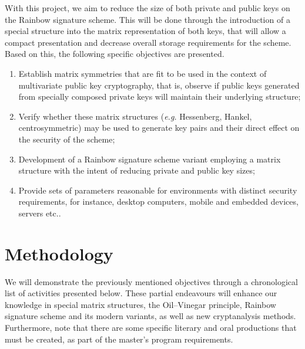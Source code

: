 \documentclass[10pt]{article}
\begin{document}
With this project, we aim to reduce the size of both private and public keys on the Rainbow signature scheme. This will be done through the introduction of a special structure into the matrix representation of both keys, that will allow a compact presentation and decrease overall storage requirements for the scheme. Based on this, the following specific objectives are presented.

\begin{enumerate}[label=\alph*.]
    \item Establish matrix symmetries that are fit to be used in the context of multivariate public key cryptography, that is, observe if public keys generated from specially composed private keys will maintain their underlying structure;
    \item Verify whether these matrix structures (\emph{e.g.} Hessenberg, Hankel, centrosymmetric) may be used to generate key pairs and their direct effect on the security of the scheme;
    \item Development of a Rainbow signature scheme variant employing a matrix structure with the intent of reducing private and public key sizes;
    \item Provide sets of parameters reasonable for environments with distinct security requirements, for instance, desktop computers, mobile and embedded devices, servers etc..
\end{enumerate}

\section{Methodology}

We will demonstrate the previously mentioned objectives through a chronological list of activities presented below. These partial endeavours will enhance our knowledge in special matrix structures, the Oil--Vinegar principle, Rainbow signature scheme and its modern variants, as well as new cryptanalysis methods. Furthermore, note that there are some specific literary and oral productions that must be created, as part of the master's program requirements.
\end{document}
